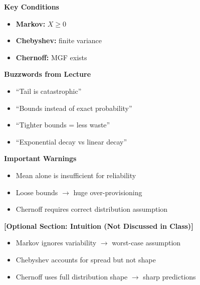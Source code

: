 \documentclass[11pt]{article}
\begin{document}
\vspace{0.3cm}
\textbf{Key Conditions}
\begin{itemize}
    \item[\checkmark] \textbf{Markov:} $X \ge 0$
    \item[\checkmark] \textbf{Chebyshev:} finite variance
    \item[\checkmark] \textbf{Chernoff:} MGF exists
\end{itemize}

\vspace{0.3cm}
\textbf{Buzzwords from Lecture}
\begin{itemize}
    \item ``Tail is catastrophic''
    \item ``Bounds instead of exact probability''
    \item ``Tighter bounds = less waste''
    \item ``Exponential decay vs linear decay''
\end{itemize}

\vspace{0.3cm}
\textbf{Important Warnings}
\begin{itemize}
    \item[\textbf{!!!}] Mean alone is insufficient for reliability
    \item[\textbf{!!!}] Loose bounds $\rightarrow$ huge over-provisioning
    \item[\textbf{!!!}] Chernoff requires correct distribution assumption
\end{itemize}

\vspace{0.3cm}
\textbf{[Optional Section: Intuition (Not Discussed in Class)]}
\begin{itemize}
    \item Markov ignores variability $\rightarrow$ worst-case assumption
    \item Chebyshev accounts for spread but not shape
    \item Chernoff uses full distribution shape $\rightarrow$ sharp predictions
\end{itemize}
\end{document}
